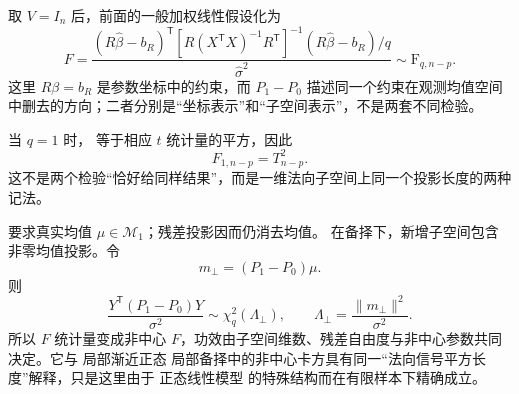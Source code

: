 \begin{corollary}[坐标形式的线性约束与 t 平方]
取 $V=I_n$ 后，前面的一般加权线性假设化为
\begin{equation}\label{eq:math-stat-general-linear-hypothesis-f}
 F
 =\frac{
 (R\widehat\beta-b_R)^{\mathsf T}
 \left[R(X^{\mathsf T}X)^{-1}R^{\mathsf T}\right]^{-1}
 (R\widehat\beta-b_R)/q
 }{\widehat\sigma^2}
 \sim\mathrm F_{q,n-p}.
\end{equation}
这里 $R\beta=b_R$ 是参数坐标中的约束，而 $P_1-P_0$ 描述同一个约束在观测均值空间中删去的方向；二者分别是“坐标表示”和“子空间表示”，不是两套不同检验。

当 $q=1$ 时， 等于相应 $t$ 统计量的平方，因此
\[
 F_{1,n-p}=T_{n-p}^2.
\]
这不是两个检验“恰好给同样结果”，而是一维法向子空间上同一个投影长度的两种记法。
\end{corollary}

\begin{proposition}[非中心参数与功效]
要求真实均值 $\mu\in\mathcal M_1$；残差投影因而仍消去均值。
在备择下，新增子空间包含非零均值投影。令
\[
 m_\perp=(P_1-P_0)\mu.
\]
则
\[
 \frac{Y^{\mathsf T}(P_1-P_0)Y}{\sigma^2}
 \sim\chi^2_q(\Lambda_\perp),
 \qquad
 \Lambda_\perp=\frac{\|m_\perp\|^2}{\sigma^2}.
\]
所以 $F$ 统计量变成非中心 $F$，功效由子空间维数、残差自由度与非中心参数共同决定。它与  局部渐近正态 局部备择中的非中心卡方具有同一“法向信号平方长度”解释，只是这里由于 正态线性模型 的特殊结构而在有限样本下精确成立。
\end{proposition}

